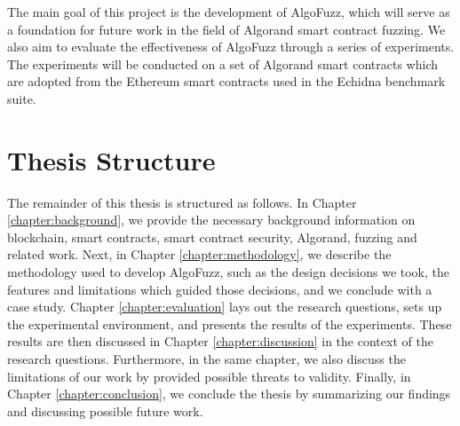 The main goal of this project is the development of AlgoFuzz, which will serve as a foundation for future work in the field of Algorand smart contract fuzzing.
We also aim to evaluate the effectiveness of AlgoFuzz  through a series of experiments.
The experiments will be conducted on a set of Algorand smart contracts which are adopted from the Ethereum smart contracts used in the Echidna benchmark suite.

\section*{Thesis Structure}
The remainder of this thesis is structured as follows.
In Chapter \ref{chapter:background}, we provide the necessary background information on blockchain, smart contracts, smart contract security, Algorand, fuzzing and related work.
Next, in Chapter \ref{chapter:methodology}, we describe the methodology used to develop AlgoFuzz, such as the design decisions we took, the features and limitations which guided those decisions, and we conclude with a case study.
Chapter \ref{chapter:evaluation} lays out the research questions, sets up the experimental environment, and presents the results of the experiments.
These results are then discussed in Chapter \ref{chapter:discussion} in the context of the research questions. Furthermore, in the same chapter, we also discuss the limitations of our work by provided possible threats to validity.
Finally, in Chapter \ref{chapter:conclusion}, we conclude the thesis by summarizing our findings and discussing possible future work.



